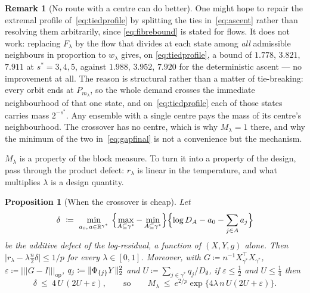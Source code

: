 \documentclass[aos]{imsart}
\DeclarePairedDelimiter{\norm}{\lVert}{\rVert}
\newcommand{\bbR}[0]{\mathbb{R}}
\newcommand{\opnorm}[1]{|\!|\!|#1|\!|\!|_{\mathrm{op}}}
\theoremstyle{plain}
\newtheorem{proposition}{Proposition}[section]
\theoremstyle{definition}
\newtheorem{remark}{Remark}[section]
\begin{document}
    \begin{remark}[No route with a centre can do better]
        \label{rem:nocentre}
        One might hope to repair the extremal profile
        of~\eqref{eq:tiedprofile} by splitting the ties in~\eqref{eq:ascent}
        rather than resolving them arbitrarily, since \eqref{eq:fibrebound} is
        stated for flows. It does not work: replacing $F_\lambda$ by the
        flow that divides at each state among \emph{all} admissible
        neighbours in proportion to $w_\lambda$ gives, on
        \eqref{eq:tiedprofile}, a bound of $1.778$, $3.821$, $7.911$ at
        $s^{\ast}=3,4,5$, against $1.988$, $3.952$, $7.920$ for the
        deterministic ascent --- no improvement at all. The reason is
        structural rather than a matter of tie-breaking: every orbit ends at
        $P_{m_\lambda}$, so the whole demand crosses the immediate
        neighbourhood of that one state, and on~\eqref{eq:tiedprofile} each
        of those states carries mass $2^{-s^{\ast}}$. Any ensemble with a
        single centre pays the mass of its centre's neighbourhood. The
        crossover has no centre, which is why $M_\lambda=1$ there, and why
        the minimum of the two in~\eqref{eq:gapfinal} is not a convenience but
        the mechanism.
    \end{remark}

    $M_\lambda$ is a property of the block measure. To turn it into a
    property of the design, pass through the product defect: $r_\lambda$ is
    linear in the temperature, and what multiplies $\lambda$ is a design
    quantity.

    \begin{proposition}[When the crossover is cheap]
        \label{prop:pdefect}
        Let
        \begin{equation}
            \label{eq:addefect}
            \delta\ \coloneq\ \min_{a_0,\,a\in\bbR^{\gamma^{\ast}}}\
            \Bigl\{\max_{A\subseteq\gamma^{\ast}}
            -\min_{A\subseteq\gamma^{\ast}}\Bigr\}
            \Bigl\{\log D_A-a_0-\sum_{j\in A}a_j\Bigr\}
        \end{equation}
        be the \emph{additive defect} of the log-residual, a function of
        $(X,Y,g)$ alone. Then
        $\bigl|r_\lambda-\lambda\tfrac n2\delta\bigr|\leq1/p$ for every
        $\lambda\in[0,1]$. Moreover, with $G\coloneq n^{-1}
        X_{\gamma^{\ast}}^{\top}X_{\gamma^{\ast}}$,
        $\varepsilon\coloneq\opnorm{G-I}$,
        $q_j\coloneq\norm{\Phi_{\{j\}}Y}_2^{2}$ and
        $U\coloneq\sum_{j\in\gamma^{\ast}}q_j/D_\emptyset$, if
        $\varepsilon\leq\tfrac12$ and $U\leq\tfrac14$ then
        \begin{equation}
            \label{eq:deltabound}
            \delta\ \leq\ 4\,U\,(2U+\varepsilon),
            \qquad\text{so}\qquad
            M_\lambda\ \leq\
            e^{2/p}\exp\bigl\{4\lambda\,n\,U(2U+\varepsilon)\bigr\} .
        \end{equation}
    \end{proposition}
\end{document}
